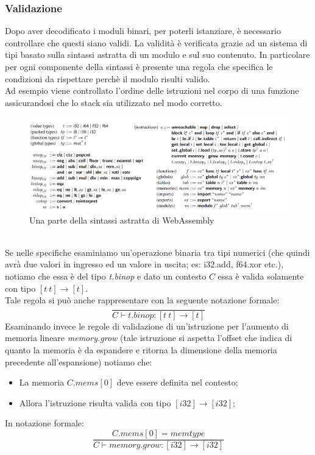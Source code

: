 \subsubsection{Validazione}
Dopo aver decodificato i moduli binari, per poterli istanziare, è necessario controllare che questi siano validi.
La validità è verificata grazie ad un sistema di tipi basato sulla sintassi astratta di un modulo e sul suo contenuto. In particolare per ogni componente della sintassi è presente una regola che specifica le condizioni da rispettare perchè il modulo risulti valido.
\\Ad esempio viene controllato l'ordine delle istruzioni nel corpo di una funzione assicurandosi che lo stack sia utilizzato nel modo corretto.
\begin{figure}
        \begin{center}
                \includegraphics[width=1\columnwidth]{images/wasmSyntax.png}
        \end{center}
        \caption{Una parte della sintassi astratta di WebAssembly}
        \label{fig:wasmSyntax}
\end{figure}
\\Se nelle specifiche esaminiamo un'operazione binaria tra tipi numerici (che quindi avrà due valori in ingresso ed un valore in uscita; es: i32.add, f64.xor etc.), notiamo che essa è del tipo \emph{t.binop} e dato un contesto \(C\) essa è valida solamente con tipo \([t~t]{\rightarrow} [t]\).
\\Tale regola si può anche rappresentare con la seguente notazione formale:
\begin{equation*}
\frac{
}{
        C {\vdash} t\mathsf{.}{\mathit{binop}} : [t~t] {\rightarrow} [t]
}
\end{equation*}
Esaminando invece le regole di validazione di un'istruzione per l'aumento di memoria lineare \emph{memory.grow} (tale istruzione si aspetta l'offset che indica di quanto la memoria è da espandere e ritorna la dimensione della memoria precedente all'espansione) notiamo che:
\begin{itemize}
        \item La memoria \(C.{\mathit{mems}}[0]\) deve essere definita nel contesto;
        \item Allora l'istruzione risulta valida con tipo \([{\mathit{i32}}] {\rightarrow} [{\mathit{i32}}]\);
\end{itemize}
In notazione formale:
\begin{equation*}
        \frac{
        C.{\mathit{mems}}[0] = {\mathit{memtype}}
      }{
        C {\vdash} {\mathit{memory.grow}} : [{\mathit{i32}}] {\rightarrow} [{\mathit{i32}}]
      }        
\end{equation*}
